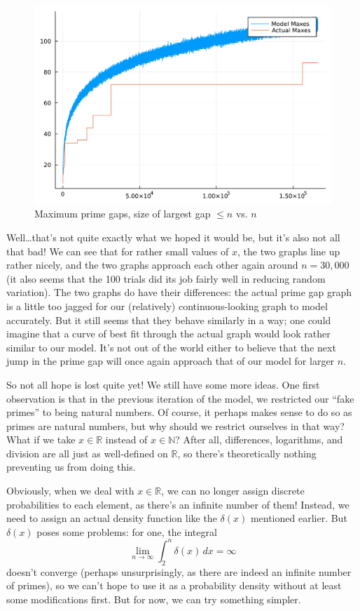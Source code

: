 \documentclass[conference]{IEEEtran}
\begin{document}
\begin{figure}[H]
  \centering
  \includegraphics[width=\linewidth,keepaspectratio]{random-plot1.pdf}
  \caption{Maximum prime gaps, size of largest gap $\le n$ vs. $n$}
\end{figure}

Well\ldots that's not quite exactly what we hoped it would be,
but it's also not all that bad! We can see that for rather
small values of $x$, the two graphs line up rather nicely,
and the two graphs approach each other again around $n = 30{,}000$
(it also seems that the 100 trials did its job fairly well in reducing
random variation). The two graphs do have their differences:
the actual prime gap graph is a little too jagged for our
(relatively) continuous-looking graph to model accurately. But it
still seems that they behave similarly in a way; one could imagine that
a curve of best fit through the actual graph would look rather similar
to our model. It's not out of the world either to believe that the next
jump in the prime gap will once again approach that of
our model for larger $n$.

So not all hope is lost quite yet! We still have some more ideas.
One first observation is that in the previous iteration of the model,
we restricted our ``fake primes'' to being natural numbers. Of course,
it perhaps makes sense to do so as primes are natural numbers, but
why should we restrict ourselves in that way? What if we take $x \in \mathbb{R}$
instead of $x \in \mathbb{N}$? After all, differences, logarithms, and
division are all just as well-defined on $\mathbb{R}$, so there's theoretically
nothing preventing us from doing this.

Obviously, when we deal with $x \in \mathbb{R}$, we can
no longer assign discrete probabilities to each element,
as there's an infinite number of them! Instead, we need
to assign an actual density function like the $\delta(x)$
mentioned earlier. But $\delta(x)$ poses some problems:
for one, the integral
\[\lim_{n \to \infty} \int_2^n \delta(x)\, dx = \infty\]
doesn't converge (perhaps unsurprisingly, as there are
indeed an infinite number of primes), so we can't hope to
use it as a probability density without at least some
modifications first. But for now, we can try something
simpler.
\end{document}
